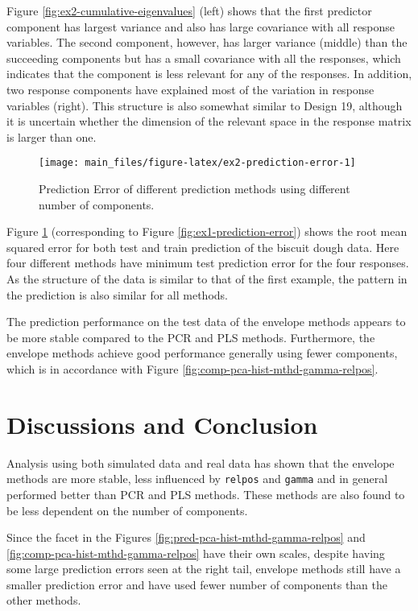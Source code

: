 \documentclass[review]{elsarticle}
\begin{document}
Figure \ref{fig:ex2-cumulative-eigenvalues} (left) shows that the first
predictor component has largest variance and also has large covariance
with all response variables. The second component, however, has larger
variance (middle) than the succeeding components but has a small
covariance with all the responses, which indicates that the component is
less relevant for any of the responses. In addition, two response
components have explained most of the variation in response variables
(right). This structure is also somewhat similar to Design 19, although
it is uncertain whether the dimension of the relevant space in the
response matrix is larger than one.

\begin{figure}[!htb]
\texttt{[image: main\_files/figure-latex/ex2-prediction-error-1]} \caption{Prediction Error of different prediction methods using different number of components.}\label{fig:ex2-prediction-error}
\end{figure}

Figure \ref{fig:ex2-prediction-error} (corresponding to Figure
\ref{fig:ex1-prediction-error}) shows the root mean squared error for
both test and train prediction of the biscuit dough data. Here four
different methods have minimum test prediction error for the four
responses. As the structure of the data is similar to that of the first
example, the pattern in the prediction is also similar for all methods.

The prediction performance on the test data of the envelope methods
appears to be more stable compared to the PCR and PLS methods.
Furthermore, the envelope methods achieve good performance generally
using fewer components, which is in accordance with Figure
\ref{fig:comp-pca-hist-mthd-gamma-relpos}.

\section{Discussions and Conclusion}\label{discussions-and-conclusion}

Analysis using both simulated data and real data has shown that the
envelope methods are more stable, less influenced by \texttt{relpos} and
\texttt{gamma} and in general performed better than PCR and PLS methods.
These methods are also found to be less dependent on the number of
components.

Since the facet in the Figures \ref{fig:pred-pca-hist-mthd-gamma-relpos}
and \ref{fig:comp-pca-hist-mthd-gamma-relpos} have their own scales,
despite having some large prediction errors seen at the right tail,
envelope methods still have a smaller prediction error and have used
fewer number of components than the other methods.
\end{document}
